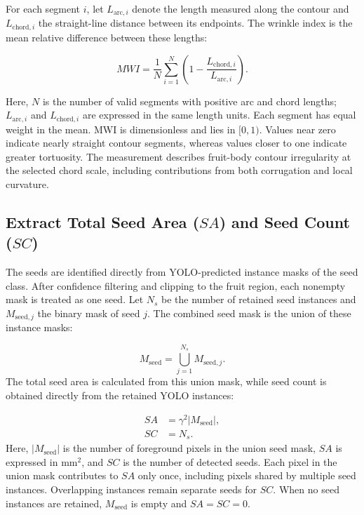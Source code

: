 \documentclass[final,5p,times,twocolumn]{elsarticle}
\begin{document}
For each segment $i$, let $L_{\mathrm{arc},i}$ denote the length measured along the contour and $L_{\mathrm{chord},i}$ the straight-line distance between its endpoints. The wrinkle index is the mean relative difference between these lengths:

\begin{equation}
MWI=\frac{1}{N}\sum_{i=1}^{N}\left(1-\frac{L_{\mathrm{chord},i}}{L_{\mathrm{arc},i}}\right).
\end{equation}

Here, $N$ is the number of valid segments with positive arc and chord lengths; $L_{\mathrm{arc},i}$ and $L_{\mathrm{chord},i}$ are expressed in the same length units. Each segment has equal weight in the mean. MWI is dimensionless and lies in $[0,1)$. Values near zero indicate nearly straight contour segments, whereas values closer to one indicate greater tortuosity. The measurement describes fruit-body contour irregularity at the selected chord scale, including contributions from both corrugation and local curvature.

\subsection*{Extract Total Seed Area ($SA$) and Seed Count ($SC$)}
The seeds are identified directly from YOLO-predicted instance masks of the seed class. After confidence filtering and clipping to the fruit region, each nonempty mask is treated as one seed. Let $N_s$ be the number of retained seed instances and $M_{\mathrm{seed},j}$ the binary mask of seed $j$. The combined seed mask is the union of these instance masks:

\begin{equation}
M_{\mathrm{seed}}=\bigcup_{j=1}^{N_s}M_{\mathrm{seed},j}.
\end{equation}
The total seed area is calculated from this union mask, while seed count is obtained directly from the retained YOLO instances:

\begin{align}
SA&=\gamma^2|M_{\mathrm{seed}}|,\\
SC&=N_s.
\end{align}
Here, $|M_{\mathrm{seed}}|$ is the number of foreground pixels in the union seed mask, $SA$ is expressed in mm$^2$, and $SC$ is the number of detected seeds. Each pixel in the union mask contributes to $SA$ only once, including pixels shared by multiple seed instances. Overlapping instances remain separate seeds for $SC$. When no seed instances are retained, $M_{\mathrm{seed}}$ is empty and $SA=SC=0$.
\end{document}
